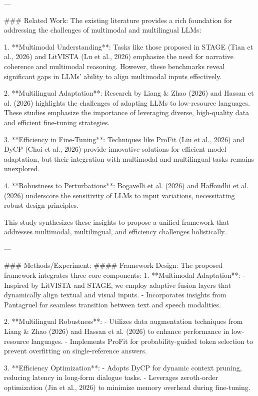 ---

### Related Work:
The existing literature provides a rich foundation for addressing the challenges of multimodal and multilingual LLMs:

1. **Multimodal Understanding**: Tasks like those proposed in STAGE (Tian et al., 2026) and LitVISTA (Lu et al., 2026) emphasize the need for narrative coherence and multimodal reasoning. However, these benchmarks reveal significant gaps in LLMs' ability to align multimodal inputs effectively.

2. **Multilingual Adaptation**: Research by Liang & Zhao (2026) and Hassan et al. (2026) highlights the challenges of adapting LLMs to low-resource languages. These studies emphasize the importance of leveraging diverse, high-quality data and efficient fine-tuning strategies.

3. **Efficiency in Fine-Tuning**: Techniques like ProFit (Liu et al., 2026) and DyCP (Choi et al., 2026) provide innovative solutions for efficient model adaptation, but their integration with multimodal and multilingual tasks remains unexplored.

4. **Robustness to Perturbations**: Bogavelli et al. (2026) and Haffoudhi et al. (2026) underscore the sensitivity of LLMs to input variations, necessitating robust design principles.

This study synthesizes these insights to propose a unified framework that addresses multimodal, multilingual, and efficiency challenges holistically.

---

### Methods/Experiment:
#### Framework Design:
The proposed framework integrates three core components:
1. **Multimodal Adaptation**:
   - Inspired by LitVISTA and STAGE, we employ adaptive fusion layers that dynamically align textual and visual inputs.
   - Incorporates insights from Pantagruel for seamless transition between text and speech modalities.

2. **Multilingual Robustness**:
   - Utilizes data augmentation techniques from Liang & Zhao (2026) and Hassan et al. (2026) to enhance performance in low-resource languages.
   - Implements ProFit for probability-guided token selection to prevent overfitting on single-reference answers.

3. **Efficiency Optimization**:
   - Adopts DyCP for dynamic context pruning, reducing latency in long-form dialogue tasks.
   - Leverages zeroth-order optimization (Jin et al., 2026) to minimize memory overhead during fine-tuning.

